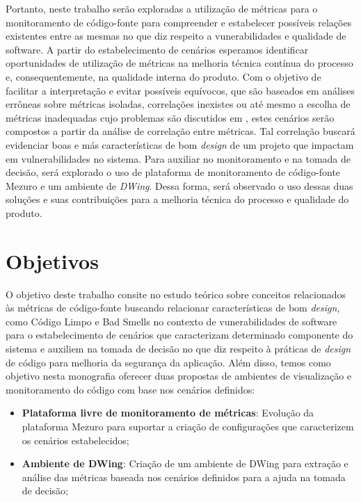 Portanto, neste trabalho serão exploradas a utilização de métricas para o monitoramento de código-fonte para compreender e estabelecer possíveis relações existentes entre as mesmas no que diz respeito a vunerabilidades e qualidade de software.
%
A partir do estabelecimento de cenários esperamos identificar oportunidades de utilização de métricas na melhoria técnica contínua do processo e, consequentemente, na qualidade interna do produto. Com o objetivo de facilitar a interpretação e evitar possíveis equívocos, que são baseados em análises errôneas sobre métricas isoladas, correlações inexistes ou até mesmo a escolha de métricas inadequadas cujo problemas são discutidos em \cite{chidamber1994}, estes cenários serão compostos a partir da análise de correlação entre métricas. Tal correlação buscará evidenciar boas e más características de bom \emph{design} de um projeto que impactam em vulnerabilidades no sistema.
%
Para auxiliar no monitoramento e na tomada de decisão, será explorado o uso de plataforma de monitoramento de código-fonte Mezuro e um ambiente de \emph{DWing}.
%
Dessa forma, será observado o uso dessas duas soluções e suas contribuições para a melhoria técnica do processo e qualidade do produto.


\section{Objetivos}

O objetivo deste trabalho consite no estudo teórico sobre conceitos relacionados às métricas de código-fonte buscando relacionar características de bom \emph{design}, como Código Limpo e Bad Smells no contexto de vunerabilidades de software  para o estabelecimento de cenários que caracterizam determinado componente do sistema e auxiliem na tomada de decisão no que diz respeito à práticas de \emph{design} de código para melhoria da segurança da aplicação.
%
Além disso, temos como objetivo nesta monografia oferecer duas propostas de ambientes de visualização e monitoramento do código com base nos cenários definidos:
\begin{itemize}
\item \textbf{Plataforma livre de monitoramento de métricas}: Evolução da plataforma Mezuro para suportar a criação de configurações que caracterizem os cenários estabelecidos;
\item \textbf{Ambiente de DWing}: Criação de um ambiente de DWing para extração e análise das métricas baseada nos cenários definidos para a ajuda na tomada de decisão;
\end{itemize}

